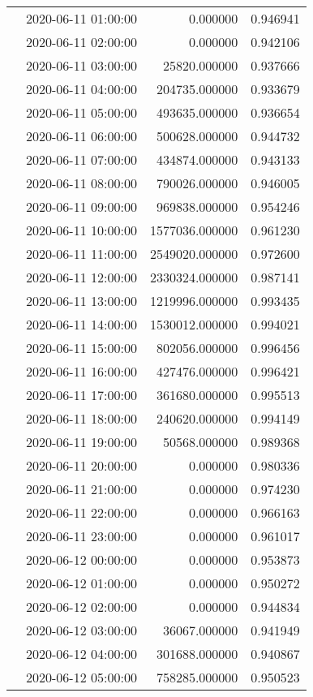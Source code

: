 \begin{tabular}{llrr}
 & 2020-06-11 01:00:00 & 0.000000 & 0.946941 \\
 & 2020-06-11 02:00:00 & 0.000000 & 0.942106 \\
 & 2020-06-11 03:00:00 & 25820.000000 & 0.937666 \\
 & 2020-06-11 04:00:00 & 204735.000000 & 0.933679 \\
 & 2020-06-11 05:00:00 & 493635.000000 & 0.936654 \\
 & 2020-06-11 06:00:00 & 500628.000000 & 0.944732 \\
 & 2020-06-11 07:00:00 & 434874.000000 & 0.943133 \\
 & 2020-06-11 08:00:00 & 790026.000000 & 0.946005 \\
 & 2020-06-11 09:00:00 & 969838.000000 & 0.954246 \\
 & 2020-06-11 10:00:00 & 1577036.000000 & 0.961230 \\
 & 2020-06-11 11:00:00 & 2549020.000000 & 0.972600 \\
 & 2020-06-11 12:00:00 & 2330324.000000 & 0.987141 \\
 & 2020-06-11 13:00:00 & 1219996.000000 & 0.993435 \\
 & 2020-06-11 14:00:00 & 1530012.000000 & 0.994021 \\
 & 2020-06-11 15:00:00 & 802056.000000 & 0.996456 \\
 & 2020-06-11 16:00:00 & 427476.000000 & 0.996421 \\
 & 2020-06-11 17:00:00 & 361680.000000 & 0.995513 \\
 & 2020-06-11 18:00:00 & 240620.000000 & 0.994149 \\
 & 2020-06-11 19:00:00 & 50568.000000 & 0.989368 \\
 & 2020-06-11 20:00:00 & 0.000000 & 0.980336 \\
 & 2020-06-11 21:00:00 & 0.000000 & 0.974230 \\
 & 2020-06-11 22:00:00 & 0.000000 & 0.966163 \\
 & 2020-06-11 23:00:00 & 0.000000 & 0.961017 \\
 & 2020-06-12 00:00:00 & 0.000000 & 0.953873 \\
 & 2020-06-12 01:00:00 & 0.000000 & 0.950272 \\
 & 2020-06-12 02:00:00 & 0.000000 & 0.944834 \\
 & 2020-06-12 03:00:00 & 36067.000000 & 0.941949 \\
 & 2020-06-12 04:00:00 & 301688.000000 & 0.940867 \\
 & 2020-06-12 05:00:00 & 758285.000000 & 0.950523 \\

\end{tabular}
